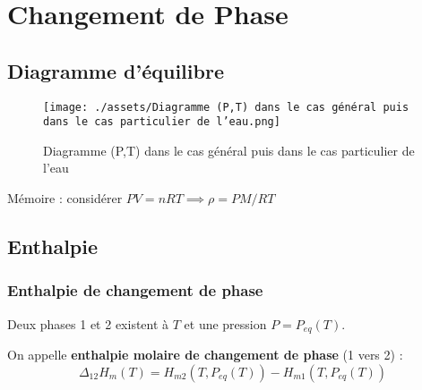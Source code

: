 \chapter{Changement de Phase} %
\label{chap:Changement de Phase}

\section{Diagramme d'équilibre} %
\label{sec:Diagramme d'équilibre}

\begin{figure}[H] %
  \centering
  \texttt{[image: ./assets/Diagramme (P,T) dans le cas général puis dans le cas particulier de l'eau.png]}
  \caption{Diagramme (P,T) dans le cas général puis dans le cas particulier de l'eau}
  \label{fig:Diagramme (P,T) dans le cas général puis dans le cas particulier de l'eau}
\end{figure}

Mémoire : considérer $PV = nRT \implies \rho =PM/RT$


\section{Enthalpie} %
\label{sec:Enthalpie}

\subsection{Enthalpie de changement de phase} %
\label{sub:Enthalpie de changement de phase}

Deux phases 1 et 2 existent à $T$ et une pression $P = P _{eq}(T)$. 

On appelle \textbf{enthalpie molaire de changement de phase} (1 vers 2) : 
\begin{equation}
  \Delta _{12} H_m(T) = H _{m2} (T , P _{eq}(T)) - H _{m1}(T, P _{eq}(T))
\end{equation}

